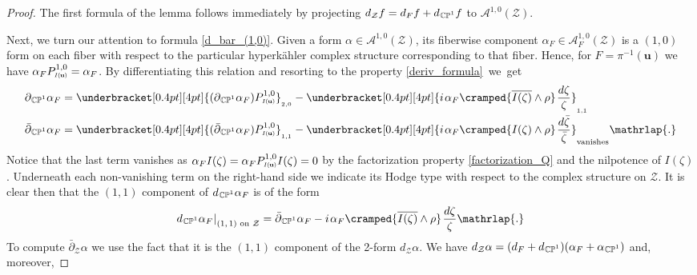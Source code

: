 \documentclass[11pt]{amsart}
\theoremstyle{remark}
\theoremstyle{remark}
\theoremstyle{definition}
\theoremstyle{definition}
\theoremstyle{definition}
\newcommand{\Iu}{\scriptscriptstyle{I\nhp(\nhp\mathbf{u}\hspace{-0.25pt})}} %
\newcommand{\0}{{\scriptstyle 0'}} %
\newcommand{\1}{{\scriptstyle 1'}}
\newcommand{\pt}{\hspace{1pt}} %
\newcommand{\hp}{\hspace{0.5pt}} %
\newcommand{\nhp}{\hspace{-0.5pt}} %
\begin{document}
\begin{proof}

The first formula of the lemma follows immediately by projecting $d_{\mathcal{Z}}f = d_Ff + d_{\hp\smash{\mathbb{CP}^1}}f$ to $\mathscr{A}^{1,0}(\mathcal{Z})$.

Next, we turn our attention to formula \eqref{d_bar_(1,0)}. Given a form $\alpha \in \mathscr{A}^{1,0}(\mathcal{Z})$, its fiberwise component \mbox{$\alpha_F \in \mathscr{A}_F^{1,0}(\mathcal{Z})$} is a $(1,0)$ form on each fiber with respect to the particular hyperk\"ahler complex structure corresponding to that fiber. Hence, for $F=\pi^{-1}(\mathbf{u})$ we have $\alpha_F P^{1,0}_{\Iu} = \alpha_F$. By differentiating this relation and resorting to the property \eqref{deriv_formula}~we~get
{\allowdisplaybreaks
\begin{equation}
\begin{aligned}
\partial_{\hp\smash{\mathbb{CP}^1}}\alpha_F & = \underbracket[0.4pt][4pt]{(\partial_{\hp\smash{\mathbb{CP}^1}}\alpha_F) P^{1,0}_{\Iu}}_{\text{$_{2,0}$}} -  \underbracket[0.4pt][4pt]{ i \pt \alpha_F\cramped{\overline{I(\zeta)} \wedge \rho} \pt \frac{d\zeta}{\zeta} }_{\text{$_{1,1}$}} \\[-2pt]
\bar{\partial}_{\hp\smash{\mathbb{CP}^1}}\alpha_F & = \underbracket[0.4pt][4pt]{(\bar{\partial}_{\hp\smash{\mathbb{CP}^1}}\alpha_F) P^{1,0}_{\Iu}}_{\text{$_{1,1}$}} - \underbracket[0.4pt][4pt]{ i \pt \alpha_F\cramped{I(\zeta) \wedge \rho} \pt \frac{d\bar{\zeta}}{\bar{\zeta}} }_{\text{vanishes}} \mathrlap{.}
\end{aligned}
\end{equation}
}%
Notice that the last term vanishes as \mbox{$\alpha_FI(\zeta) = \alpha_FP^{1,0}_{\Iu}I(\zeta) = 0$} by the factorization property \eqref{factorization_Q} and the nilpotence of $I(\zeta)$. Underneath each non-vanishing term on the right-hand side we indicate its Hodge type with respect to the complex structure on $\mathcal{Z}$. It is clear then that the $(1,1)$ component of $d_{\hp\smash{\mathbb{CP}^1}} \alpha_F$ is of the form 
\begin{equation}
d_{\hp\smash{\mathbb{CP}^1}} \alpha_F \hp |^{\phantom{+}}_{\text{$(1,1)$ on $\mathcal{Z}$}} = \bar{\partial}_{\hp\smash{\mathbb{CP}^1}}\alpha_F - i \pt \alpha_F\cramped{\overline{I(\zeta)} \wedge \rho} \pt \frac{d\zeta}{\zeta} \mathrlap{.}
\end{equation}
To compute $\bar{\partial}_{\mathcal{Z}}\alpha$ we use the fact that it is the $(1,1)$ component of the 2-form $d_{\mathcal{Z}}\alpha$. We have $d_{\mathcal{Z}}\alpha = (d_F+d_{\hp\smash{\mathbb{CP}^1}})(\alpha_F + \alpha_{\hp\smash{\mathbb{CP}^1}})$ and, moreover, 

\end{proof}
\end{document}

